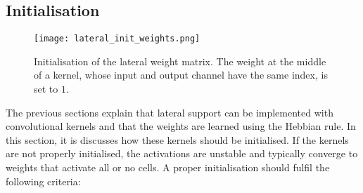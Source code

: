 


\subsection{Initialisation}
\begin{figure}[h]
    \centering
    \texttt{[image: lateral\_init\_weights.png]}
    \caption[Initialisation of the lateral weight matrix]{Initialisation of the lateral weight matrix. The weight at the middle of a kernel, whose input and output channel have the same index, is set to $1$.}
\end{figure}
The previous sections explain that lateral support can be implemented with convolutional kernels and that the weights are learned using the Hebbian rule.
In this section, it is discusses how these kernels should be initialised.
If the kernels are not properly initialised, the activations are unstable and typically converge to weights that activate all or no cells.
A proper initialisation should fulfil the following criteria:

